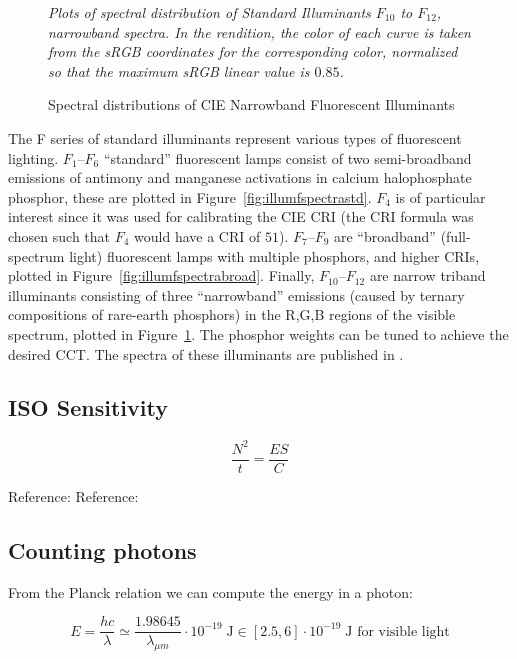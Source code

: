 \begin{figure}
{
\small
\centering

\caption{Spectral distributions of CIE Narrowband Fluorescent Illuminants}
\label{fig:illumfspectranarrow}
}
\vskip 1mm
{\footnotesize\it Plots of spectral distribution of
Standard Illuminants $F_{10}$ to $F_{12}$, narrowband spectra.
In the rendition, the color of each curve is taken from the
sRGB coordinates for the corresponding color,
normalized so that the maximum sRGB linear value is $0.85$.
}
\end{figure}

The F series of standard illuminants represent various types of fluorescent lighting.
$F_1$--$F_6$ ``standard'' fluorescent lamps consist of two semi-broadband
emissions of
antimony and manganese activations in calcium halophosphate phosphor, these are
plotted in Figure~\ref{fig:illumfspectrastd}. $F_4$ is of
particular interest since it was used for calibrating the \gls{CIE} \gls{CRI}
(the \gls{CRI} formula was chosen such that $F_4$ would have a \gls{CRI} of
$51$).
$F_7$--$F_9$ are ``broadband'' (full-spectrum light) fluorescent lamps with
multiple phosphors, and higher \glspl{CRI}, plotted in
Figure~\ref{fig:illumfspectrabroad}. Finally, $F_{10}$--$F_{12}$ are narrow
triband illuminants consisting of three ``narrowband'' emissions (caused by
ternary
compositions of rare-earth phosphors) in the R,G,B regions of the visible
spectrum, plotted in Figure~\ref{fig:illumfspectranarrow}.
The phosphor weights can be tuned to achieve the desired \gls{CCT}.
The spectra of these illuminants are published in \cite{ciecolorimetry}.

\ifomit
\subsection{ISO Sensitivity}

\begin{equation}
\frac{N^2}t = \frac{ES}{C}
\end{equation}

Reference: 
Reference: 

\subsection{Counting photons}

From the Planck relation we can compute the energy in a photon:

\begin{equation}
E = \frac{hc}{\lambda} \simeq \frac{1.98645}{\lambda_{\mu m}}\cdot 10^{-19} \;\si{\joule} \in [2.5, 6]\cdot 10^{-19} \;\si{\joule} \text{~for visible light}
\end{equation}

